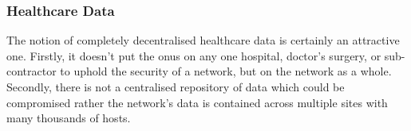 \subsubsection{Healthcare Data}

The notion of completely decentralised healthcare data is certainly an attractive one. Firstly, it doesn't put the onus on any one hospital, doctor's surgery, or sub-contractor to uphold the security of a network, but on the network as a whole. Secondly, there is not a centralised repository of data which could be compromised rather the network's data is contained across multiple sites with many thousands of hosts.
